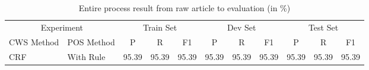 \begin{table}[htbp!]
    \centering
    \begin{tabular}{llccccccccc}
    \toprule
        \multicolumn{2}{c}{Experiment}    & \multicolumn{3}{c}{Train Set}  & \multicolumn{3}{c}{Dev Set} & \multicolumn{3}{c}{Test Set}  \\
        CWS Method      & POS Method      & P     & R     & F1             & P     & R     & F1          & P     & R     & F1            \\
    \midrule
        CRF             & With Rule       & 95.39 & 95.39 & 95.39          & 95.39 & 95.39 & 95.39       & 95.39 & 95.39 & 95.39         \\
    \bottomrule
    \end{tabular}
\caption{Entire process result from raw article to evaluation (in \%)}
\label{tab:pos_with_cws}
\end{table}